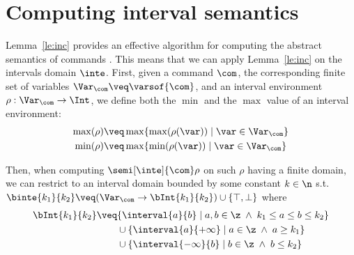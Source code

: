 \section{Computing interval semantics}
\label{sec:computingint}

Lemma~\ref{le:inc} provides an effective algorithm for computing the abstract
semantics of commands%
. This means that we can apply Lemma~\ref{le:inc} on the intervals
domain \(\inte\).  First, given a command \(\com\), the corresponding
finite set of variables \(\Var_{\com} \veq \varsof{\com}\), and an
interval environment \(\rho : \Var_{\com} \to \Int\), we define both
the \(\min\) and the \(\max\) value of an interval environment:
\begin{align*}
\max(\rho) & \veq \max \{ \max(\rho(\var)) \mid \var \in \Var_{\com}\} \\
\min(\rho) & \veq \max \{ \min(\rho(\var)) \mid \var \in \Var_{\com}\}
\end{align*}

% 
Then, when computing \(\semi[\inte]{\com} \rho\) on such \(\rho\)
having a finite domain, we can restrict to an interval domain bounded
by some constant \(k\in\n\) s.t.
\(\binte{k_1}{k_2} \veq (\Var_{\com} \to \bInt{k_1}{k_2}) \cup \{\top, \bot\}\)
where
\begin{align*}
  \bInt{k_1}{k_2} & \veq \{ \interval{a}{b} \mid a, b \in \z \; \land \; k_1 \leq a \leq b \leq k_2\} \\
                  & \phantom{\veq} \cup \{\interval{a}{+\infty} \mid a \in \z \; \land \; a \geq k_1\} \\
                  & \phantom{\veq} \cup \{\interval{-\infty}{b} \mid b \in \z \; \land \; b \leq k_2\}
\end{align*}

